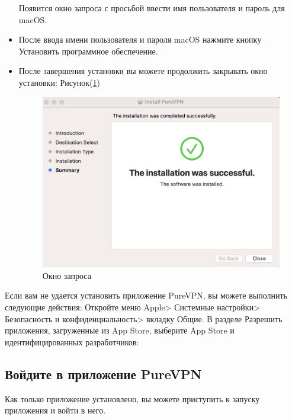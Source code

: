 \begin{itemize}
Появится окно запроса с просьбой ввести имя пользователя и пароль для macOS.
\item После ввода имени пользователя и пароля macOS нажмите кнопку Установить программное обеспечение.
\item После завершения установки вы можете продолжить закрывать окно установки:  Рисунок(\ref{fig:28})
\begin{figure}[H]
\includegraphics[width=14cm]{23.png}
\centering
\caption{Окно запроса}
\label{fig:28}
\end{figure}
\end{itemize}

Если вам не удается установить приложение PureVPN, вы можете выполнить следующие действия: Откройте меню Apple> Системные настройки> Безопасность и конфиденциальность> вкладку Общие. В разделе Разрешить приложения, загруженные из App Store, выберите App Store и идентифицированных разработчиков:

\subsection{Войдите в приложение PureVPN} 
Как только приложение установлено, вы можете приступить к запуску приложения и войти в него.

